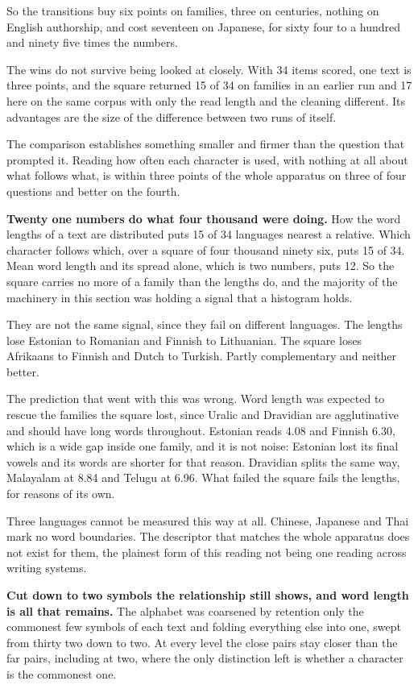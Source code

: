 So the transitions buy six points on families, three on centuries, nothing on English authorship, and cost seventeen on Japanese, for sixty four to a hundred and ninety five times the numbers.

The wins do not survive being looked at closely. With 34 items scored, one text is three points, and the square returned 15 of 34 on families in an earlier run and 17 here on the same corpus with only the read length and the cleaning different. Its advantages are the size of the difference between two runs of itself.

The comparison establishes something smaller and firmer than the question that prompted it. Reading how often each character is used, with nothing at all about what follows what, is within three points of the whole apparatus on three of four questions and better on the fourth.

\textbf{Twenty one numbers do what four thousand were doing.} How the word lengths of a text are distributed puts 15 of 34 languages nearest a relative. Which character follows which, over a square of four thousand ninety six, puts 15 of 34. Mean word length and its spread alone, which is two numbers, puts 12. So the square carries no more of a family than the lengths do, and the majority of the machinery in this section was holding a signal that a histogram holds.

They are not the same signal, since they fail on different languages. The lengths lose Estonian to Romanian and Finnish to Lithuanian. The square loses Afrikaans to Finnish and Dutch to Turkish. Partly complementary and neither better.

The prediction that went with this was wrong. Word length was expected to rescue the families the square lost, since Uralic and Dravidian are agglutinative and should have long words throughout. Estonian reads 4.08 and Finnish 6.30, which is a wide gap inside one family, and it is not noise: Estonian lost its final vowels and its words are shorter for that reason. Dravidian splits the same way, Malayalam at 8.84 and Telugu at 6.96. What failed the square fails the lengths, for reasons of its own.

Three languages cannot be measured this way at all. Chinese, Japanese and Thai mark no word boundaries. The descriptor that matches the whole apparatus does not exist for them, the plainest form of this reading not being one reading across writing systems.

\textbf{Cut down to two symbols the relationship still shows, and word length is all that remains.} The alphabet was coarsened by retention only the commonest few symbols of each text and folding everything else into one, swept from thirty two down to two. At every level the close pairs stay closer than the far pairs, including at two, where the only distinction left is whether a character is the commonest one.

